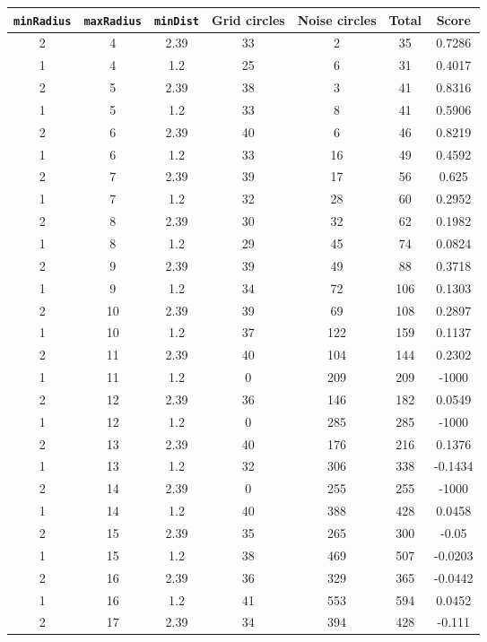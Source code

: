 \documentclass[letterpaper, 12pt]{article}
\begin{document}
\begin{longtable}{|c|c|c|c|c|c|c|}
\hline
\textbf{\texttt{minRadius}} & \textbf{\texttt{maxRadius}} & \textbf{\texttt{minDist}} & \textbf{Grid circles} & \textbf{Noise circles} & \textbf{Total} & \textbf{Score} \\
\hline
2 & 4 & 2.39 & 33 & 2 & 35 & 0.7286 \\
\hline
1 & 4 & 1.2 & 25 & 6 & 31 & 0.4017 \\
\hline
2 & 5 & 2.39 & 38 & 3 & 41 & 0.8316 \\
\hline
1 & 5 & 1.2 & 33 & 8 & 41 & 0.5906 \\
\hline
2 & 6 & 2.39 & 40 & 6 & 46 & 0.8219 \\
\hline
1 & 6 & 1.2 & 33 & 16 & 49 & 0.4592 \\
\hline
2 & 7 & 2.39 & 39 & 17 & 56 & 0.625 \\
\hline
1 & 7 & 1.2 & 32 & 28 & 60 & 0.2952 \\
\hline
2 & 8 & 2.39 & 30 & 32 & 62 & 0.1982 \\
\hline
1 & 8 & 1.2 & 29 & 45 & 74 & 0.0824 \\
\hline
2 & 9 & 2.39 & 39 & 49 & 88 & 0.3718 \\
\hline
1 & 9 & 1.2 & 34 & 72 & 106 & 0.1303 \\
\hline
2 & 10 & 2.39 & 39 & 69 & 108 & 0.2897 \\
\hline
1 & 10 & 1.2 & 37 & 122 & 159 & 0.1137 \\
\hline
2 & 11 & 2.39 & 40 & 104 & 144 & 0.2302 \\
\hline
1 & 11 & 1.2 & 0 & 209 & 209 & -1000 \\
\hline
2 & 12 & 2.39 & 36 & 146 & 182 & 0.0549 \\
\hline
1 & 12 & 1.2 & 0 & 285 & 285 & -1000 \\
\hline
2 & 13 & 2.39 & 40 & 176 & 216 & 0.1376 \\
\hline
1 & 13 & 1.2 & 32 & 306 & 338 & -0.1434 \\
\hline
2 & 14 & 2.39 & 0 & 255 & 255 & -1000 \\
\hline
1 & 14 & 1.2 & 40 & 388 & 428 & 0.0458 \\
\hline
2 & 15 & 2.39 & 35 & 265 & 300 & -0.05 \\
\hline
1 & 15 & 1.2 & 38 & 469 & 507 & -0.0203 \\
\hline
2 & 16 & 2.39 & 36 & 329 & 365 & -0.0442 \\
\hline
1 & 16 & 1.2 & 41 & 553 & 594 & 0.0452 \\
\hline
2 & 17 & 2.39 & 34 & 394 & 428 & -0.111 \\

\end{longtable}
\end{document}
